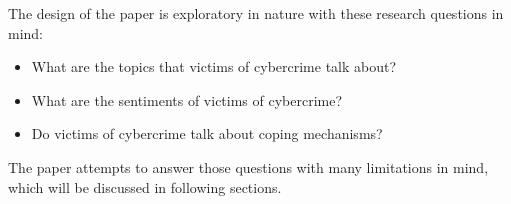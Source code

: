 \bigskip

The design of the paper is exploratory in nature with these research questions in mind:

\begin{itemize}
    \item What are the topics that victims of cybercrime talk about?
    \item What are the sentiments of victims of cybercrime?
    \item Do victims of cybercrime talk about coping mechanisms?
\end{itemize}


The paper attempts to answer those questions with many limitations in mind, which will be discussed in following sections.